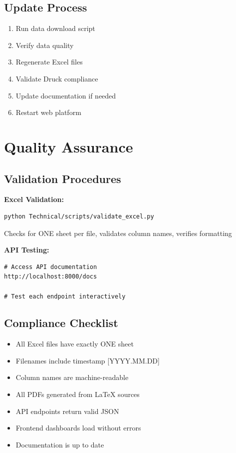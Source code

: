 \documentclass[11pt,letterpaper]{article}
\begin{document}
\subsection{Update Process}
\begin{enumerate}
    \item Run data download script
    \item Verify data quality
    \item Regenerate Excel files
    \item Validate Druck compliance
    \item Update documentation if needed
    \item Restart web platform
\end{enumerate}

\section{Quality Assurance}

\subsection{Validation Procedures}

\textbf{Excel Validation:}
\begin{verbatim}
python Technical/scripts/validate_excel.py
\end{verbatim}
Checks for ONE sheet per file, validates column names, verifies formatting

\textbf{API Testing:}
\begin{verbatim}
# Access API documentation
http://localhost:8000/docs

# Test each endpoint interactively
\end{verbatim}

\subsection{Compliance Checklist}
\begin{itemize}
    \item[$\square$] All Excel files have exactly ONE sheet
    \item[$\square$] Filenames include timestamp [YYYY.MM.DD]
    \item[$\square$] Column names are machine-readable
    \item[$\square$] All PDFs generated from LaTeX sources
    \item[$\square$] API endpoints return valid JSON
    \item[$\square$] Frontend dashboards load without errors
    \item[$\square$] Documentation is up to date
\end{itemize}
\end{document}
